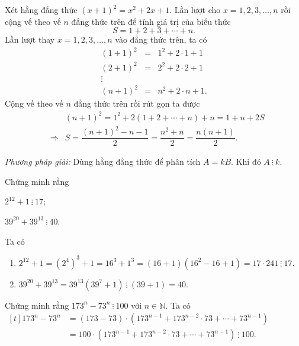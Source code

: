 \begin{vd}
	Xét hằng đẳng thức $(x+1)^2 = x^2 + 2x + 1$. Lần lượt cho $x = 1,2,3, \ldots , n$ rồi cộng vế theo vế $n$ đẳng thức trên để tính giá trị của biểu thức
	\[S = 1+2+3+ \cdots +n.\]
	\loigiai
	{
		Lần lượt thay $x = 1,2,3, \ldots, n$ vào đẳng thức trên, ta có
		{\allowdisplaybreaks
		\begin{eqnarray*}
			(1+1)^2 &=& 1^2 + 2 \cdot 1 + 1 \\
			(2+1)^2 &=& 2^2 + 2 \cdot 2 + 1 \\
			\vdots  \\
			(n+1)^2 &=& n^2 + 2 \cdot n + 1. 
		\end{eqnarray*}
		}
		Cộng vế theo vế $n$ đẳng thức trên rồi rút gọn ta được
		{\allowdisplaybreaks
		\begin{eqnarray*}
			&&(n+1)^2 = 1^2 + 2(1+2+ \cdots + n) + n = 1+n + 2S \\
			&\Rightarrow& S = \dfrac{(n+1)^2 - n - 1}{2} = \dfrac{n^2 + n}{2} = \dfrac{n(n+1)}{2}.
		\end{eqnarray*}
		}	
	}
\end{vd}

\begin{dang}
	\emph{Phương pháp giải:} Dùng hằng đẳng thức để phân tích $A = kB$. Khi đó $A \ \vdots \ k$.
\end{dang}

\begin{vd}
	Chứng minh rằng
	\begin{listEX}[2]
		\item $2^{12}+1 \ \vdots \ 17$;
		\item $39^{20} + 39^{13} \ \vdots \ 40$.
	\end{listEX}
	\loigiai 
	{
		Ta có 
		\begin{enumerate}
			\item $2^{12}+1 = \left(2^4\right)^3 + 1 = 16^3 + 1^3 = (16+1)\left(16^2 - 16 + 1\right) = 17 \cdot 241 \ \vdots \ 17$.
			\item $39^{20} + 39^{13} = 39^{13} \left(39^7 + 1\right) \ \vdots \ (39+1) = 40$.
		\end{enumerate}
		
	}
\end{vd}

\begin{vd}
	Chứng minh rằng $173^n - 73^n \ \vdots \ 100$ với $n \in \mathbb{N}$.
	\loigiai 
	{
		Ta có 
		{\allowdisplaybreaks
		$\begin{aligned}[t]
			173^n - 73^n &= (173 - 73) \cdot \left(173^{n-1} + 173^{n-2} \cdot 73 + \cdots + 73^{n-1}\right) \\
			&=100 \cdot \left(173^{n-1} + 173^{n-2} \cdot 73 + \cdots + 73^{n-1}\right) \ \vdots \ 100.
		\end{aligned}$
		}
	}
\end{vd}

